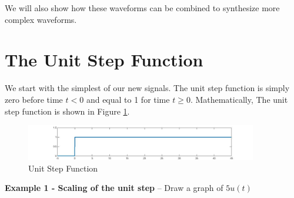 \documentclass{handout}
\begin{document}

We will also show how these waveforms can be combined to synthesize more complex waveforms.

\newpage
\clearpage
\pagebreak

\section{The Unit Step Function}
We start with the simplest of our new signals.  The unit step function is simply zero before time $t<0$ and equal to 1 for time $t\ge0$.  Mathematically,
The unit step function is shown in Figure \ref{fig: UnitStep}.
\begin{figure} [h!]
\centering
\includegraphics[width=0.9\textwidth]{UnitStep.jpg}
\caption{Unit Step Function}
\label{fig: UnitStep}
\end{figure}

\textbf{Example 1 - Scaling of the unit step} -- Draw a graph of $5u(t)$

\end{document}
